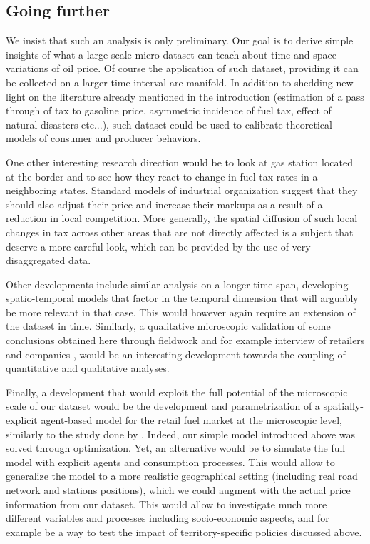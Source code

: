 \documentclass[10pt]{article}
\begin{document}
\subsection*{Going further}

We insist that such an analysis is only preliminary. Our goal is to derive simple insights of what a large scale micro dataset can teach about time and space variations of oil price. Of course the application of such dataset, providing it can be collected on a larger time interval are manifold. In addition to shedding new light on the literature already mentioned in the introduction (estimation of a pass through of tax to gasoline price, asymmetric incidence of fuel tax, effect of natural disasters etc...), such dataset could be used to calibrate theoretical models of consumer and producer behaviors.

One other interesting research direction would be to look at gas station located at the border and to see how they react to change in fuel tax rates in a neighboring states. Standard models of industrial organization suggest that they should also adjust their price and increase their markups as a result of a reduction in local competition. More generally, the spatial diffusion of such local changes in tax across other areas that are not directly affected is a subject that deserve a more careful look, which can be provided by the use of very disaggregated data. 

Other developments include similar analysis on a longer time span, developing spatio-temporal models that factor in the temporal dimension that will arguably be more relevant in that case. This would however again require an extension of the dataset in time. Similarly, a qualitative microscopic validation of some conclusions obtained here through fieldwork and for example interview of retailers and companies \citep{melaina2017investing}, would be an interesting development towards the coupling of quantitative and qualitative analyses.

Finally, a development that would exploit the full potential of the microscopic scale of our dataset would be the development and parametrization of a spatially-explicit agent-based model for the retail fuel market at the microscopic level, similarly to the study done by \cite{heppenstall2005hybrid}. Indeed, our simple model introduced above was solved through optimization. Yet, an alternative would be to simulate the full model with explicit agents and consumption processes. This would allow to generalize the model to a more realistic geographical setting (including real road network and stations positions), which we could augment with the actual price information from our dataset. This would allow to investigate much more different variables and processes including socio-economic aspects, and for example be a way to test the impact of territory-specific policies discussed above.
\end{document}
